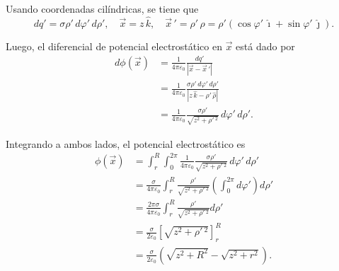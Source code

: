 \begin{ejemplo}
Usando coordenadas cilíndricas, se tiene que
$$dq' = \sigma \rho' \,d\varphi'\,d\rho',\quad \Vec{x} = z\,\hat{k}, \quad \Vec{x}\,' = \rho' \, \hat{\rho} = \rho' (\cos \varphi'\,\hat{\imath} + \sin \varphi'\,\hat{\jmath}).$$

Luego, el diferencial de potencial electrostático en $\vec{x}$ está dado por
\begin{align*}
    d\phi(\Vec{x}) &= \frac{1}{4\pi\varepsilon_0} \frac{dq'}{|\vec{x} - \Vec{x}\,'|} \\
    &= \frac{1}{4\pi\varepsilon_0} \frac{\sigma \rho' \,d\varphi'\,d\rho'}{|z\,\hat{k} - \rho' \,\hat{\rho}|}\\
    &= \frac{1}{4\pi\varepsilon_0} \frac{\sigma \rho'}{\sqrt{z^2 + \rho'\,^2}} \,d\varphi'\,d\rho'.
\end{align*}

Integrando a ambos lados, el potencial electrostático es
\begingroup
\allowdisplaybreaks
\begin{align*}
    \phi(\Vec{x}) &= \int_r^R \int_0^{2\pi}  \frac{1}{4\pi\varepsilon_0} \frac{\sigma \rho'}{\sqrt{z^2 + \rho'\,^2}} \,d\varphi'\,d\rho' \\
    &= \frac{\sigma}{4\pi \varepsilon_0} \int_r^R \frac{\rho'}{\sqrt{z^2+\rho'\,^2}} \left(\int_0^{2\pi} d\varphi' \right) d\rho' \\
    &= \frac{2\pi \sigma}{4\pi \varepsilon_0} \int_r^R \frac{\rho'}{\sqrt{z^2+\rho'\,^2}}  d\rho' \\
    &= \frac{\sigma}{2\varepsilon_0} \left[ \sqrt{z^2 + \rho'\,^2}\right]_r^R \\
    &= \frac{\sigma}{2\varepsilon_0} \left( \sqrt{z^2 + R^2} - \sqrt{z^2 + r^2}\right).
\end{align*}
\endgroup
  
\end{ejemplo}

